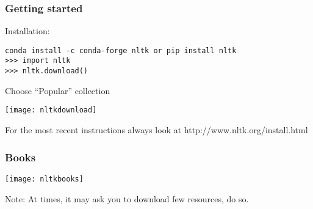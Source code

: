 %

\begin{frame}[fragile]\frametitle{Getting started}
Installation:
  \begin{lstlisting}
conda install -c conda-forge nltk or pip install nltk
>>> import nltk
>>> nltk.download()
  \end{lstlisting}
  
Choose ``Popular'' collection
\begin{center}
\texttt{[image: nltkdownload]}
\end{center}

For the most recent instructions always look at http://www.nltk.org/install.html
\end{frame}

\begin{frame}[fragile]\frametitle{Books}
\begin{center}
\texttt{[image: nltkbooks]}
\end{center}

Note: At times, it may ask you to download few resources, do so.
\end{frame}

